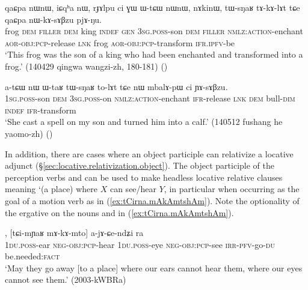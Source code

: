 \begin{exe}
\ex \label{ex:tWsNaR.tAkAlAt}
\gll qaɕpa nɯnɯ, iɕqʰa nɯ, rɟɤlpu ci ɣɯ ɯ-tɕɯ nɯnɯ, nɤkinɯ, tɯ-sŋaʁ tɤ-kɤ-lɤt tɕe qaɕpa nɯ-kɤ-sɤβzu pjɤ-ŋu. \\
frog \textsc{dem} \textsc{filler} \textsc{dem} king \textsc{indef} \textsc{gen} \textsc{3sg}.\textsc{poss}-son \textsc{dem} \textsc{filler} \textsc{nmlz}:\textsc{action}-enchant \textsc{aor}-\textsc{obj}:\textsc{pcp}-release \textsc{lnk} frog \textsc{aor}-\textsc{obj}:\textsc{pcp}-transform \textsc{ifr}.\textsc{ipfv}-be \\
\glt `This frog was the son of a king who had been enchanted and transformed into a frog.' (140429 qingwa wangzi-zh,  180-181) 	()
\end{exe}

\begin{exe}
\ex \label{ex:WtaR.tWsNaR.tolAt}
\gll  a-tɕɯ nɯ ɯ-taʁ tɯ-sŋaʁ to-lɤt tɕe nɯ mbalɤ-pɯ ci ɲɤ-sɤβzu. \\
\textsc{1sg}.\textsc{poss}-son \textsc{dem} \textsc{3sg}.\textsc{poss}-on \textsc{nmlz}:\textsc{action}-enchant \textsc{ifr}-release \textsc{lnk} \textsc{dem} bull-\textsc{dim} \textsc{indef} \textsc{ifr}-transform \\
\glt `She cast a spell on my son and turned him into a calf.' (140512 fushang he yaomo-zh)
()
\end{exe}
 
In addition, there are cases where an object participle can relativize a locative adjunct (§\ref{sec:locative.relativization.object}). The object participle of the perception verbs  and  can be used to make headless locative relative clauses meaning `(a place) where $X$ can see/hear $Y$, in particular when occurring as the goal of a motion verb as in (\ref{ex:tCirna.mAkAmtshAm}). Note the optionality of the ergative on the nouns  and  in (\ref{ex:tCirna.mAkAmtshAm}). 

\begin{exe}
\ex \label{ex:tCirna.mAkAmtshAm}
, [tɕi-mɲaʁ mɤ-kɤ-mto] a-jɤ-ɕe-ndʑi ra \\
\textsc{1du}.\textsc{poss}-ear \textsc{neg}-\textsc{obj}:\textsc{pcp}-hear \textsc{1du}.\textsc{poss}-eye \textsc{neg}-\textsc{obj}:\textsc{pcp}-see \textsc{irr}-\textsc{pfv}-go-\textsc{du} be.needed:\textsc{fact} \\
\glt  `May they go away [to a place] where our ears cannot hear them, where our eyes cannot see them.' (2003-kWBRa)
\end{exe}

